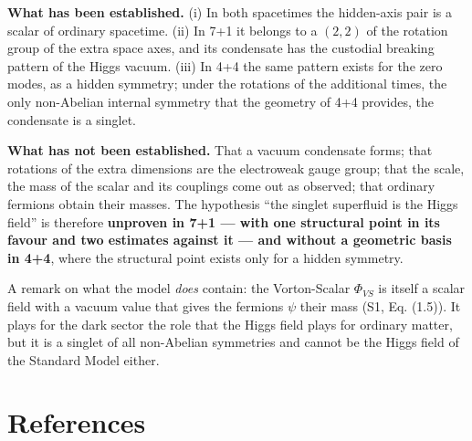 \documentclass[
  10pt,
]{article}
\begin{document}
\textbf{What has been established.} (i) In both spacetimes the
hidden-axis pair is a scalar of ordinary spacetime. (ii) In 7+1 it
belongs to a \((2,2)\) of the rotation group of the extra space axes,
and its condensate has the custodial breaking pattern of the Higgs
vacuum. (iii) In 4+4 the same pattern exists for the zero modes, as a
hidden symmetry; under the rotations of the additional times, the only
non-Abelian internal symmetry that the geometry of 4+4 provides, the
condensate is a singlet.

\textbf{What has not been established.} That a vacuum condensate forms;
that rotations of the extra dimensions are the electroweak gauge group;
that the scale, the mass of the scalar and its couplings come out as
observed; that ordinary fermions obtain their masses. The hypothesis
``the singlet superfluid is the Higgs field'' is therefore
\textbf{unproven in 7+1 --- with one structural point in its favour and
two estimates against it --- and without a geometric basis in 4+4},
where the structural point exists only for a hidden symmetry.

A remark on what the model \emph{does} contain: the Vorton-Scalar
\(\Phi_{VS}\) is itself a scalar field with a vacuum value that gives
the fermions \(\psi\) their mass (S1, Eq. (1.5)). It plays for the dark
sector the role that the Higgs field plays for ordinary matter, but it
is a singlet of all non-Abelian symmetries and cannot be the Higgs field
of the Standard Model either.

\hypertarget{references}{%
\section{References}\label{references}}
\end{document}
